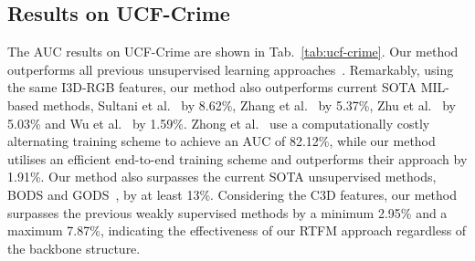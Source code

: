 \documentclass[10pt,twocolumn,letterpaper]{article}
\begin{document}
\subsection{Results on UCF-Crime}

The AUC results on UCF-Crime are shown in Tab.~\ref{tab:ucf-crime}. Our method outperforms all previous unsupervised learning approaches~\cite{hasan2016learning,sohrab2018subspace,luo2017revisit,wang2019gods}. Remarkably, using the same I3D-RGB features, our method also  outperforms current SOTA MIL-based methods, Sultani et al.~\cite{sultani2018real} by 8.62\%, Zhang et al.~\cite{8803657} by 5.37\%, Zhu et al.~\cite{zhu2019motion} by 5.03\% and Wu et al.~\cite{Wu2020not} by 1.59\%.  Zhong et al.~\cite{zhong2019graph} use a computationally costly alternating training scheme
to achieve an AUC of 82.12\%, while our method utilises an efficient end-to-end training scheme
and outperforms their approach by 1.91\%. Our method also surpasses the current SOTA unsupervised methods, BODS and GODS~\cite{wang2019gods}, by at least 13\%. 
Considering the C3D features, our method surpasses the previous weakly supervised methods by a minimum 2.95\% and a maximum 7.87\%, indicating the effectiveness of our RTFM approach regardless of the backbone structure.  
\end{document}
